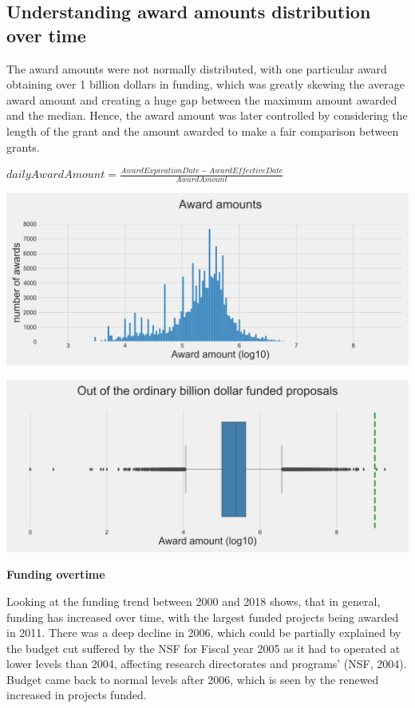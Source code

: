 \documentclass[11pt, oneside]{article}   	%
\begin{document}
 \subsection{Understanding award amounts distribution over time} 
 
The award amounts were not normally distributed, with one particular award obtaining over 1 billion dollars in funding, which was greatly skewing the average award amount and creating a huge gap between the maximum amount awarded and the median.  Hence, the award amount was later controlled by considering the length of the grant and the amount awarded to make a fair comparison between grants.
\begin{center}
$dailyAwardAmount = \frac{AwardExpirationDate-AwardEffectiveDate }{AwardAmount}$
\end{center}

\includegraphics[width=\textwidth]{hist}

\includegraphics[width=\textwidth]{boxplot}

 \textbf{{Funding overtime} }
 
Looking at the funding trend between 2000 and 2018 shows, that in general, funding has increased over time, with the largest funded projects being awarded in 2011. There was a deep decline in 2006, which could be partially explained by the budget cut suffered by the NSF for Fiscal year 2005 as it had to operated at lower levels than 2004, affecting research directorates and programs' (NSF, 2004). Budget came back to normal levels after 2006, which is seen by the renewed increased in projects funded.
\end{document}

